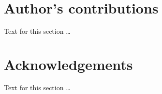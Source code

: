 \documentclass{bmcart}
\begin{document}
{\begin{backmatter}
\section*{Author's contributions}
    Text for this section \ldots

\section*{Acknowledgements}
  Text for this section \ldots










\end{backmatter}}
\end{document}
